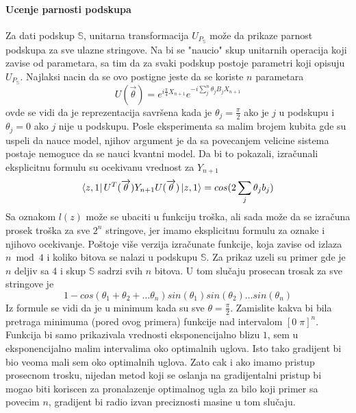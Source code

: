 \documentclass[12pt, letterpaper, oneside]{article}
\begin{document}
\paragraph{Ucenje parnosti podskupa}
Za dati podskup $\mathbb{S}$, unitarna transformacija $U_{P_\mathbb{S}}$ može da prikaze parnost podskupa za sve ulazne stringove.
Na bi se "naucio" skup unitarnih operacija koji zavise od parametara, sa tim da za svaki podskup postoje parametri koji opisuju $U_{P_\mathbb{S}}$.
Najlaksi nacin da se ovo postigne jeste da se koriste $n$ parametara
\[
    U(\overrightarrow{\theta}) = e^{i\frac{\pi}{4}X_{n+1}}e^{-i\sum_j^n \theta_jB_jX_{n+1}}
\]
ovde se vidi da je reprezentacija savršena kada je $\theta_j = \frac{\pi}{2}$ ako je $j$ u podskupu i$\theta_j = 0$ ako $j$ nije u podskupu.
Posle eksperimenta sa malim brojem kubita gde su uspeli da nauce model, njihov argument je da sa povecanjem velicine sistema postaje nemoguce da se nauci kvantni model.
Da bi to pokazali, izračunali eksplicitnu formulu su ocekivanu vrednost za $Y_{n+1}$
\[
    \bra{z,1}U^T(\overrightarrow{\theta})Y_{n+1}U(\overrightarrow{\theta})\Ket{z,1} = cos(2\sum_j\theta_jb_j)
\]
Sa oznakom $l(z)$ može se ubaciti u funkciju troška, ali sada može da se izračuna prosek
troška za sve $2^n$ stringove, jer imamo eksplicitnu formulu za oznake i njihovo ocekivanje.
Poštoje više verzija izračunate funkcije, koja zavise od izlaza $n \bmod 4$ i koliko bitova se nalazi u podskupu $\mathbb{S}$.
Za prikaz uzeli su primer gde je $n$ deljiv sa 4 i skup $\mathbb{S}$ sadrzi svih $n$ bitova.
U tom slučaju prosecan trosak za sve stringove je 
\[
    1 - cos(\theta_1 + \theta_2 + \dots \theta_n)sin(\theta_1)sin(\theta_2) \dots sin(\theta_n)
\]
Iz formule se vidi da je u minimum kada su sve $\theta=\frac{\pi}{2}$. Zamislite kakva bi bila pretraga minimuma (pored ovog primera) funkcije
nad intervalom $[0\;\pi]^n$. Funkcija bi samo prikazivala vrednosti eksponencijalno blizu $1$, sem u eksponencijalno malim intervalima oko optimalnih uglova.
Isto tako gradijent bi bio veoma mali sem oko optimalnih uglova. Zato cak i ako imamo pristup prosecnom trosku, nijedan metod koji se oslanja na gradijentalni pristup
bi mogao biti koriscen za pronalazenje optimalnog ugla za bilo koji primer sa povecim $n$, gradijent bi radio izvan preciznosti masine u tom slučaju.
\end{document}
